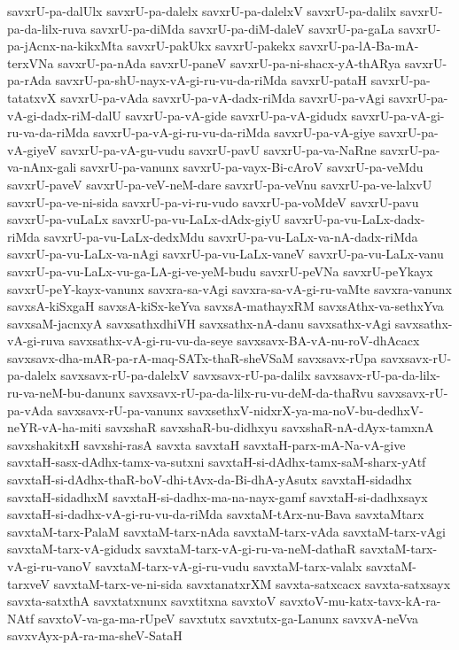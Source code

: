 {savxrU-pa-dalUlx
savxrU-pa-dalelx
savxrU-pa-dalelxV
savxrU-pa-dalilx
savxrU-pa-da-lilx-ruva
savxrU-pa-diMda
savxrU-pa-diM-daleV
savxrU-pa-gaLa
savxrU-pa-jAcnx-na-kikxMta
savxrU-pakUkx
savxrU-pakekx
savxrU-pa-lA-Ba-mA-terxVNa
savxrU-pa-nAda
savxrU-paneV
savxrU-pa-ni-shacx-yA-thARya
savxrU-pa-rAda
savxrU-pa-shU-nayx-vA-gi-ru-vu-da-riMda
savxrU-pataH
savxrU-pa-tatatxvX
savxrU-pa-vAda
savxrU-pa-vA-dadx-riMda
savxrU-pa-vAgi
savxrU-pa-vA-gi-dadx-riM-dalU
savxrU-pa-vA-gide
savxrU-pa-vA-gidudx
savxrU-pa-vA-gi-ru-va-da-riMda
savxrU-pa-vA-gi-ru-vu-da-riMda
savxrU-pa-vA-giye
savxrU-pa-vA-giyeV
savxrU-pa-vA-gu-vudu
savxrU-pavU
savxrU-pa-va-NaRne
savxrU-pa-va-nAnx-gali
savxrU-pa-vanunx
savxrU-pa-vayx-Bi-cAroV
savxrU-pa-veMdu
savxrU-paveV
savxrU-pa-veV-neM-dare
savxrU-pa-veVnu
savxrU-pa-ve-lalxvU
savxrU-pa-ve-ni-sida
savxrU-pa-vi-ru-vudo
savxrU-pa-voMdeV
savxrU-pavu
savxrU-pa-vuLaLx
savxrU-pa-vu-LaLx-dAdx-giyU
savxrU-pa-vu-LaLx-dadx-riMda
savxrU-pa-vu-LaLx-dedxMdu
savxrU-pa-vu-LaLx-va-nA-dadx-riMda
savxrU-pa-vu-LaLx-va-nAgi
savxrU-pa-vu-LaLx-vaneV
savxrU-pa-vu-LaLx-vanu
savxrU-pa-vu-LaLx-vu-ga-LA-gi-ve-yeM-budu
savxrU-peVNa
savxrU-peYkayx
savxrU-peY-kayx-vanunx
savxra-sa-vAgi
savxra-sa-vA-gi-ru-vaMte
savxra-vanunx
savxsA-kiSxgaH
savxsA-kiSx-keYva
savxsA-mathayxRM
savxsAthx-va-sethxYva
savxsaM-jacnxyA
savxsathxdhiVH
savxsathx-nA-danu
savxsathx-vAgi
savxsathx-vA-gi-ruva
savxsathx-vA-gi-ru-vu-da-seye
savxsavx-BA-vA-nu-roV-dhAcacx
savxsavx-dha-mAR-pa-rA-maq-SATx-thaR-sheVSaM
savxsavx-rUpa
savxsavx-rU-pa-dalelx
savxsavx-rU-pa-dalelxV
savxsavx-rU-pa-dalilx
savxsavx-rU-pa-da-lilx-ru-va-neM-bu-danunx
savxsavx-rU-pa-da-lilx-ru-vu-deM-da-thaRvu
savxsavx-rU-pa-vAda
savxsavx-rU-pa-vanunx
savxsethxV-nidxrX-ya-ma-noV-bu-dedhxV-neYR-vA-ha-miti
savxshaR
savxshaR-bu-didhxyu
savxshaR-nA-dAyx-tamxnA
savxshakitxH
savxshi-rasA
savxta
savxtaH
savxtaH-parx-mA-Na-vA-give
savxtaH-sasx-dAdhx-tamx-va-sutxni
savxtaH-si-dAdhx-tamx-saM-sharx-yAtf
savxtaH-si-dAdhx-thaR-boV-dhi-tAvx-da-Bi-dhA-yAsutx
savxtaH-sidadhx
savxtaH-sidadhxM
savxtaH-si-dadhx-ma-na-nayx-gamf
savxtaH-si-dadhxsayx
savxtaH-si-dadhx-vA-gi-ru-vu-da-riMda
savxtaM-tArx-nu-Bava
savxtaMtarx
savxtaM-tarx-PalaM
savxtaM-tarx-nAda
savxtaM-tarx-vAda
savxtaM-tarx-vAgi
savxtaM-tarx-vA-gidudx
savxtaM-tarx-vA-gi-ru-va-neM-dathaR
savxtaM-tarx-vA-gi-ru-vanoV
savxtaM-tarx-vA-gi-ru-vudu
savxtaM-tarx-valalx
savxtaM-tarxveV
savxtaM-tarx-ve-ni-sida
savxtanatxrXM
savxta-satxcacx
savxta-satxsayx
savxta-satxthA
savxtatxnunx
savxtitxna
savxtoV
savxtoV-mu-katx-tavx-kA-ra-NAtf
savxtoV-va-ga-ma-rUpeV
savxtutx
savxtutx-ga-Lanunx
savxvA-neVva
savxvAyx-pA-ra-ma-sheV-SataH
}
